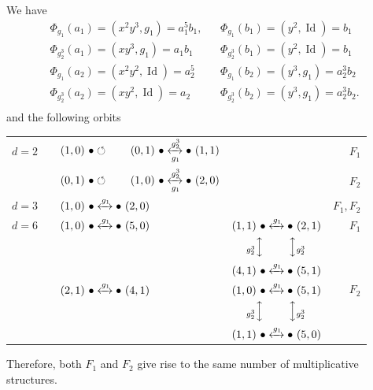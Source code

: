 \documentclass[12pt]{article}
\theoremstyle{definition}
\newcommand{\Id}{\operatorname{Id}}
\begin{document}
 We have
$$\begin{array}{lll}
\Phi_{g_1}(a_1)=(x^2y^3, g_1)=a_1^5b_1, & &
\Phi_{g_1}(b_1)=(y^2,\Id)=b_1\\
\Phi_{g_2^3}(a_1)=(xy^3,g_1)=a_1b_1  &&  \Phi_{g_2^3}(b_1)=(y^2,\Id)=b_1\\
\Phi_{g_1}(a_2)= (x^2y^2,\Id)=a_2^5 & &\Phi_{g_1}(b_2)=(y^3,g_1)=a_2^3 b_2\\
\Phi_{g_2^3}(a_2)=(xy^2,\Id)=a_2 &&    \Phi_{g_2^3}(b_2)=(y^3,g_1)=a_2^3b_2.\\
\end{array}
$$
and the following orbits
\begin{center}
	\begin{tabular}{lll l r}
		$d=2$ &  &  $(1,0)\ \bullet \circlearrowleft\qquad (0,1)\ \bullet \xleftrightarrow[g_1]{g_2^3}\bullet\  (1,1)$ && $F_1$\\[2ex]
		&  &  $(0,1)\ \bullet \circlearrowleft\qquad (1,0)\ \bullet \xleftrightarrow[g_1]{g_2^3}\bullet\  (2,0)$ & &$F_2$\\[2ex]
		$d=3$& &  $(1,0)\ \bullet \xleftrightarrow{g_1}\bullet\  (2,0)$ & &$F_1,F_2$\\[2ex]
		$d=6$ & & $ (1,0)\ \bullet \xleftrightarrow{g_1}\bullet\  (5,0)$ &
		$(1,1)\ \bullet \xleftrightarrow{g_1}\bullet\   (2,1)$ &$F_1$  \\[0.1ex]
		&&&$\quad\ {_{g_2^3}}\Big\updownarrow\qquad\  \Big\updownarrow {_{g_2^3}}$  \\
		& &&  $(4,1)\ \bullet \xleftrightarrow{g_1}\bullet\   (5,1)$ \\[2ex]
		& & $ (2,1)\ \bullet \xleftrightarrow{g_1}\bullet\  (4,1)$ &
		$(1,0)\ \bullet \xleftrightarrow{g_1}\bullet\   (5,1)$ &$F_2$  \\[0.1ex]
		&&&$\quad\ {_{g_2^3}}\Big\updownarrow\qquad\  \Big\updownarrow {_{g_2^3}}$  \\
		& &&  $(1,1)\ \bullet \xleftrightarrow{g_1}\bullet\   (5,0)$ \\
	\end{tabular}
\end{center}
Therefore, both $F_1$ and $F_2$ give rise to the same number of multiplicative structures.
\end{document}
